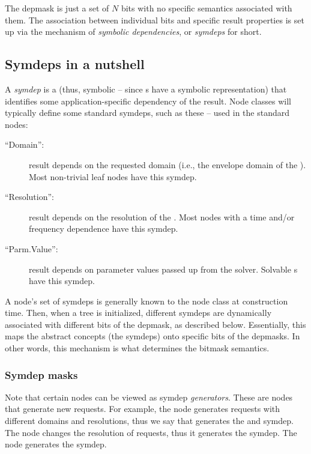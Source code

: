 \documentclass[10pt]{article}
\begin{document}
  The depmask is just a set of $N$ bits with no specific semantics associated
  with them. The association between individual bits and specific result
  properties is set up via the mechanism of {\em symbolic dependencies}, or
  {\em symdeps} for short.
  
\subsection{Symdeps in a nutshell}
  
  A {\em symdep} is a  (thus, symbolic -- since s have a
  symbolic representation) that identifies some application-specific dependency
  of the result. Node classes will typically define some standard symdeps, such
  as these -- used in the standard nodes:

  \begin{description}
  
  \item[``Domain'':] result depends on the requested domain (i.e., the envelope
    domain of the \Cells). Most non-trivial leaf nodes have this symdep.

  \item[``Resolution'':] result depends on the resolution of the \Cells. Most
    nodes with a time and/or frequency dependence have this symdep.
   
  \item[``Parm.Value'':] result depends on parameter values passed up from the
    solver. Solvable \Parm{}s have this symdep.
  
  \end{description}
  
  A node's set of symdeps is generally known to the node class at construction
  time. Then, when a tree is initialized, different symdeps are dynamically
  associated with different bits of the depmask, as described below.
  Essentially, this maps the abstract concepts (the symdeps) onto specific bits
  of the depmasks. In other words, this mechanism is what determines the
  bitmask semantics.

\subsubsection{Symdep masks}

  Note that certain nodes can be viewed as symdep {\em generators}. These are
  nodes that generate new requests. For example, the  node generates
  requests with different domains and resolutions, thus we say that 
  generates the  and  symdep. The  node
  changes the resolution of requests, thus it generates the 
  symdep. The  node generates the  symdep.
  
\end{document}

